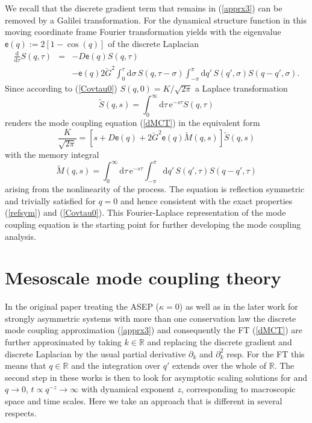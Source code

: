 \documentclass[12pt]{article}
\newcommand{\rmd}{\mathrm{d}}
\newcommand{\rme}{\mathrm{e}}
\newcommand{\R}{{\mathbb R}}
\begin{document}
We recall that the discrete gradient term that remains in 
(\ref{apprx3}) can be removed by a Galilei transformation. 
For the dynamical structure function in this moving coordinate
frame Fourier transformation
yields with the eigenvalue $\mathsf{e}(q) := 2 [1 - \cos{(q)}]$
of the discrete Laplacian
\begin{eqnarray}
\frac{\rmd}{\rmd \tau} S(q,\tau) 
& = & 
- D \mathsf{e}(q) S(q,\tau) 
\nonumber \\ & & 
- \mathsf{e}(q) 2 \check{G}^2
\int_{0}^{\tau} \rmd \sigma \,  S(q,\tau-\sigma)  
\int_{-\pi}^{\pi} \rmd q' \, 
S(q',\sigma) S(q-q',\sigma).
\label{dMCT}
\end{eqnarray}
Since according to (\ref{Covtau0}) $S(q,0)=K/\sqrt{2\pi}$ 
a Laplace transformation
\begin{equation}
\tilde{S}(q,s) = \int_{0}^\infty \rmd \tau \, \rme^{-s \tau}
S(q,\tau)
\end{equation}
renders the mode coupling equation (\ref{dMCT}) in the equivalent
form
\begin{equation}
\frac{K}{\sqrt{2\pi}}
= \left[s
+ D \mathsf{e}(q) + 2 \check{G}^2 \mathsf{e}(q) \tilde{M}(q,s)
\right] \tilde{S}(q,s) 
\label{dMCTLFT}
\end{equation}
with the memory integral
\begin{equation}
\tilde{M}(q,s) = 
\int_{0}^{\infty} \rmd \tau \, \rme^{-s \tau} 
\int_{-\pi}^{\pi} \rmd q' \, 
S(q',\tau) S(q-q',\tau)
\label{memLFT}
\end{equation}
arising from the nonlinearity of the process. The equation is reflection 
symmetric and trivially satisfied for $q=0$ and hence consistent with 
the exact properties (\ref{refsym}) and (\ref{Covtau0}). This 
Fourier-Laplace representation of the mode coupling equation is the 
starting point for further developing the mode coupling analysis. 



\section{Mesoscale mode coupling theory}

In the original paper \cite{vanB85} treating the ASEP ($\kappa=0$) 
as well as in the later work
for strongly asymmetric systems with more than one conservation 
law \cite{Spoh14,Popk15a,Popk15b} the discrete mode coupling 
approximation (\ref{apprx3}) and consequently the FT (\ref{dMCT})
are further approximated by taking $k\in\R$ and replacing the
discrete gradient and discrete Laplacian by the usual 
partial derivative $\partial_k$ and $\partial_k^2$ resp.
For the FT this means that $q\in\R$ and the integration over $q'$
extends over the whole of $\R$. The second step in these 
works is then to look for asymptotic scaling solutions for 
and $q\to 0$, $t\propto q^{-z}\to\infty$ with dynamical exponent $z$, 
corresponding to macroscopic space and time scales. Here we take 
an approach that is different in several respects.
\end{document}
